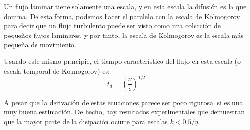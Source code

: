 Un flujo laminar tiene solamente una escala, y en esta escala la difusión es la que domina.
De esta forma, podemos hacer el paralelo con la escala de Kolmogorov para decir que un flujo turbulento puede ser visto como una colección de pequeños flujos laminares, y por tanto, la escala de Kolmogorov es la escala más pequeña de movimiento.

Usando este mismo principio, el tiempo característico del flujo en esta escala (o escala temporal de Kolmogorov) es:
%
\begin{equation}\label{eq:t_kol}
t_d = \left(\frac{\nu}{\epsilon}\right)^{1/2}
\end{equation}

A pesar que la derivación de estas ecuaciones parece ser poco rigurosa, si es una muy buena estimación.
De hecho, hay resultados experimentales que demuestran que la mayor parte de la disipación ocurre para escalas $k<0.5/\eta$.

